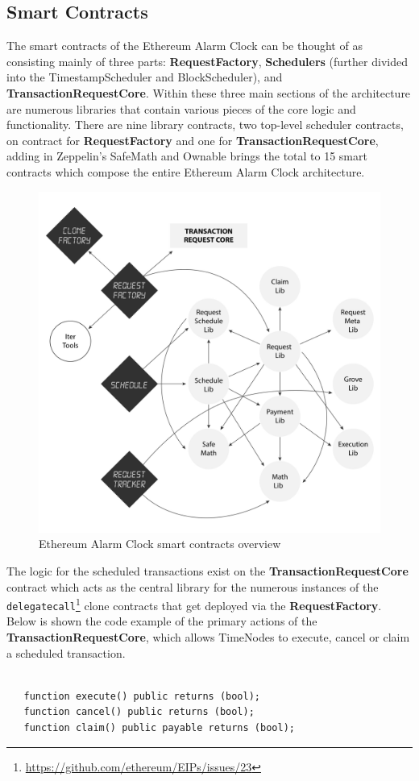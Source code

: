 \documentclass{report}
\begin{document}
  \subsection{Smart Contracts}
  The smart contracts of the Ethereum Alarm Clock can be thought of as consisting mainly of three parts: \textbf{RequestFactory}, \textbf{Schedulers} (further divided into the TimestampScheduler and BlockScheduler), and \textbf{TransactionRequestCore}. Within these three main sections of the architecture are numerous libraries that contain various pieces of the core logic and functionality. There are nine library contracts, two top-level scheduler contracts, on contract for \textbf{RequestFactory} and one for \textbf{TransactionRequestCore}, adding in Zeppelin’s SafeMath and Ownable brings the total to 15 smart contracts which compose the entire Ethereum Alarm Clock architecture.

  \begin{figure}[h]
    \includegraphics[width=\textwidth]{contracts}
    \caption{Ethereum Alarm Clock smart contracts overview}
  \end{figure}

  The logic for the scheduled transactions exist on the \textbf{TransactionRequestCore} contract which acts as the central library for the numerous instances of the \texttt{delegatecall}\footnote{\url{https://github.com/ethereum/EIPs/issues/23}} clone contracts that get deployed via the \textbf{RequestFactory}. Below is shown the code example of the primary actions of the \textbf{TransactionRequestCore}, which allows TimeNodes to execute, cancel or claim a scheduled transaction.
  \begin{verbatim}

   function execute() public returns (bool);
   function cancel() public returns (bool);
   function claim() public payable returns (bool);

  \end{verbatim}
\end{document}
